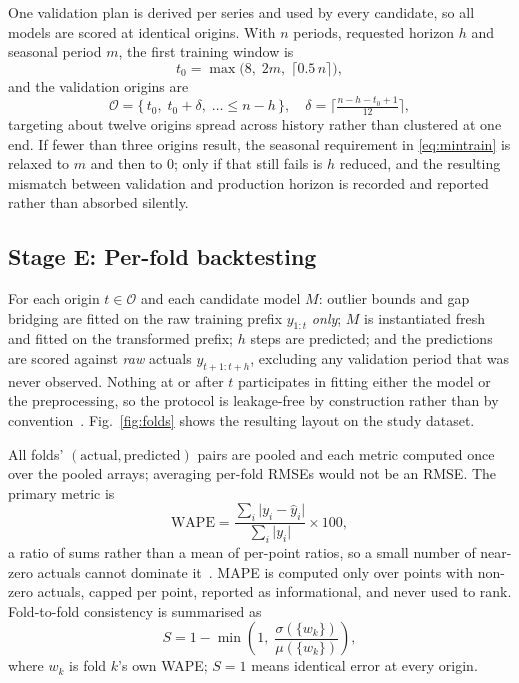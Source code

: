 \documentclass[conference]{IEEEtran}
\begin{document}
One validation plan is derived per series and used by every candidate, so all
models are scored at identical origins. With $n$ periods, requested horizon
$h$ and seasonal period $m$, the first training window is
\begin{equation}
t_0=\max\big(8,\;2m,\;\lceil 0.5\,n\rceil\big),
\label{eq:mintrain}
\end{equation}
and the validation origins are
\begin{equation}
\mathcal{O}=\{\,t_0,\;t_0+\delta,\;\dots\le n-h\,\},\quad
\delta=\Big\lceil \tfrac{n-h-t_0+1}{12} \Big\rceil ,
\label{eq:origins}
\end{equation}
targeting about twelve origins spread across history rather than clustered at
one end. If fewer than three origins result, the seasonal requirement in
\eqref{eq:mintrain} is relaxed to $m$ and then to $0$; only if that still
fails is $h$ reduced, and the resulting mismatch between validation and
production horizon is recorded and reported rather than absorbed silently.

\subsection{Stage E: Per-fold backtesting}

For each origin $t\in\mathcal{O}$ and each candidate model $M$: outlier bounds
and gap bridging are fitted on the raw training prefix $y_{1:t}$ \emph{only};
$M$ is instantiated fresh and fitted on the transformed prefix; $h$ steps are
predicted; and the predictions are scored against \emph{raw} actuals
$y_{t+1:t+h}$, excluding any validation period that was never observed. Nothing
at or after $t$ participates in fitting either the model or the preprocessing,
so the protocol is leakage-free by construction rather than by
convention~\cite{kaufman2012leakage}. Fig.~\ref{fig:folds} shows the resulting
layout on the study dataset.

All folds' $(\text{actual},\text{predicted})$ pairs are pooled and each metric
computed once over the pooled arrays; averaging per-fold RMSEs would not be an
RMSE. The primary metric is
\begin{equation}
\mathrm{WAPE}=\frac{\sum_{i}\lvert y_i-\hat y_i\rvert}{\sum_{i}\lvert y_i\rvert}\times 100 ,
\label{eq:wape}
\end{equation}
a ratio of sums rather than a mean of per-point ratios, so a small number of
near-zero actuals cannot dominate
it~\cite{hyndman2006accuracy,davydenko2013measuring}. MAPE is computed only
over points with non-zero actuals, capped per point, reported as
informational, and never used to rank. Fold-to-fold consistency is summarised
as
\begin{equation}
S=1-\min\!\left(1,\;\frac{\sigma(\{w_k\})}{\mu(\{w_k\})}\right),
\label{eq:stability}
\end{equation}
where $w_k$ is fold $k$'s own WAPE; $S=1$ means identical error at every
origin.
\end{document}
